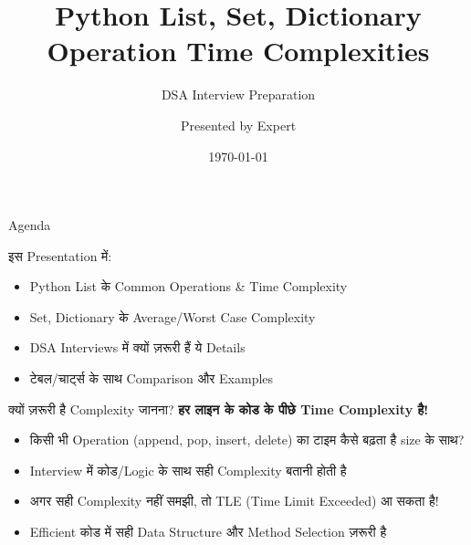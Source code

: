 \documentclass[aspectratio=169]{beamer}
\title{\textbf{Python List, Set, Dictionary Operation Time Complexities}}
\subtitle{DSA Interview Preparation}
\author{Presented by Expert}
\institute{Google Colors DSA Series}
\date{\today}
\begin{document}
{
\begin{frame}
\titlepage
\vspace{-0.8cm}
\begin{center}
\end{center}
\end{frame}
}

\begin{frame}{Agenda}
\begin{block}{इस Presentation में:}
\begin{itemize}
  \item Python List के Common Operations \& Time Complexity
  \item Set, Dictionary के Average/Worst Case Complexity
  \item DSA Interviews में क्यों ज़रूरी हैं ये Details
  \item टेबल/चार्ट्स के साथ Comparison और Examples
\end{itemize}
\end{block}
\end{frame}

\begin{frame}{क्यों ज़रूरी है Complexity जानना?}
\textbf{हर लाइन के कोड के पीछे Time Complexity है!}
\vskip0.2cm
\begin{itemize}
  \item किसी भी Operation (append, pop, insert, delete) का टाइम कैसे बढ़ता है size के साथ?
  \item Interview में कोड/Logic के साथ सही Complexity बतानी होती है
  \item अगर सही Complexity नहीं समझी, तो TLE (Time Limit Exceeded) आ सकता है!
  \item Efficient कोड में सही Data Structure और Method Selection ज़रूरी है
\end{itemize}
\end{frame}
\end{document}
